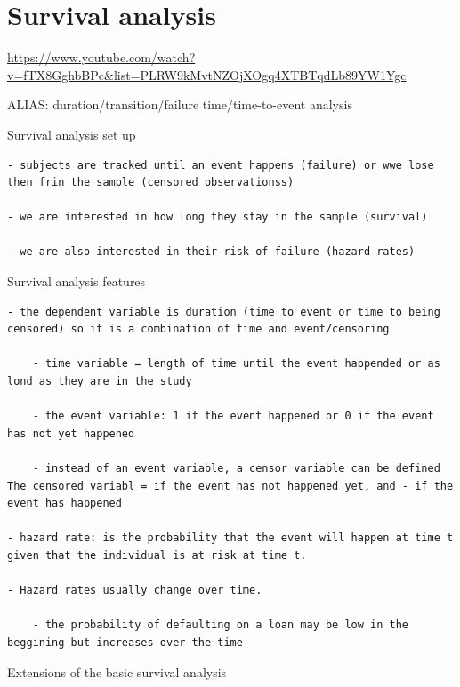\documentclass[
]{book}
\begin{document}
\hypertarget{survival-analysis}{%
\section{Survival analysis}\label{survival-analysis}}

\url{https://www.youtube.com/watch?v=fTX8GghbBPc\&list=PLRW9kMvtNZOjXOgq4XTBTqdLb89YW1Ygc}

ALIAS: duration/transition/failure time/time-to-event analysis

Survival analysis set up

\begin{verbatim}
- subjects are tracked until an event happens (failure) or wwe lose then frin the sample (censored observationss)

- we are interested in how long they stay in the sample (survival)

- we are also interested in their risk of failure (hazard rates)
\end{verbatim}

Survival analysis features

\begin{verbatim}
- the dependent variable is duration (time to event or time to being censored) so it is a combination of time and event/censoring

    - time variable = length of time until the event happended or as lond as they are in the study

    - the event variable: 1 if the event happened or 0 if the event has not yet happened

    - instead of an event variable, a censor variable can be defined The censored variabl = if the event has not happened yet, and - if the event has happened

- hazard rate: is the probability that the event will happen at time t given that the individual is at risk at time t.

- Hazard rates usually change over time.

    - the probability of defaulting on a loan may be low in the beggining but increases over the time
\end{verbatim}

Extensions of the basic survival analysis
\end{document}
